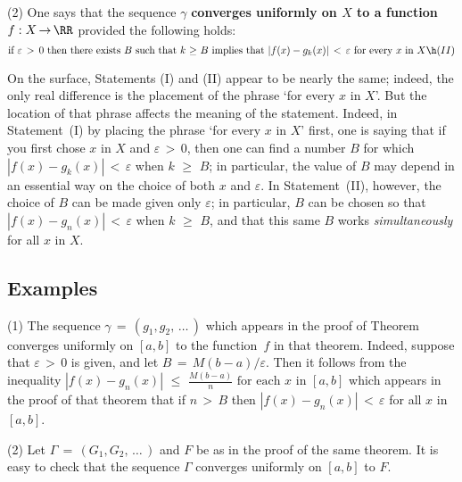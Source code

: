 \V

        (2) One says that the sequence ${\gamma}$ {\bf converges uniformly on $X$ to a function $f:X \,{\rightarrow}\, {\RR}$}
    provided the following holds:
        \begin{displaymath}
        \mbox{if ${\varepsilon}\,>\,0$ then there exists $B$ such that $k\,\,{\geq}\,\,B$ implies that $|f(x)-g_{k}(x)|\,<\,{\varepsilon}$ for every $x$ in $X$} \h (II)
        \end{displaymath}

\V
\V

        On the surface, Statements (I) and (II) appear to be nearly the same; indeed, the only real difference is the placement of the phrase `for every $x$ in $X$'.
    But the location of that phrase affects the meaning of the statement.
    Indeed, in Statement~(I) by placing the phrase `for every $x$ in $X$' first, one is saying that if you first chose $x$ in $X$ and ${\varepsilon}\,>\,0$,
    then one can find a number $B$ for which $|f(x)-g_{k}(x)|\,<\,{\varepsilon}$ when $k\,\,{\geq}\,\,B$;
    in particular, the value of $B$ may depend in an essential way on the choice of both $x$ and ${\varepsilon}$.
    In Statement~(II), however, the choice of $B$ can be made given only ${\varepsilon}$;
    in particular, $B$ can be chosen so that $|f(x)-g_{n}(x)|\,<\,{\varepsilon}$ when $k\,\,{\geq}\,\,B$, and that this same $B$ works {\em simultaneously} for all $x$ in $X$.

\V

            \subsection{\small{\bf Examples}}
            \label{ExampF05.30}

\V

\hspace*{\parindent}(1) The sequence ${\gamma} \,=\, (g_{1},g_{2},\,{\ldots}\,)$ which appears in the proof of Theorem~ converges uniformly on $[a,b]$ to the function~$f$ in that theorem.
    Indeed, suppose that ${\varepsilon}\,>\,0$ is given, and let $B \,=\, M(b-a)/{\varepsilon}$.
    Then it follows from the inequality $|f(x)-g_{n}(x)|\,\,{\leq}\,\,\frac{M(b-a)}{n} \mbox{ for each $x$ in $[a,b]$}$ which appears in the proof of that theorem that if $n\,>\,B$ then $|f(x)-g_{n}(x)|\,<\,{\varepsilon}$ for all $x$ in $[a,b]$.

\V

        (2) Let ${\Gamma} \,=\, (G_{1},G_{2},\,{\ldots}\,)$ and $F$ be as in the proof of the same theorem.
    It is easy to check that the sequence ${\Gamma}$ converges uniformly on $[a,b]$ to $F$.

